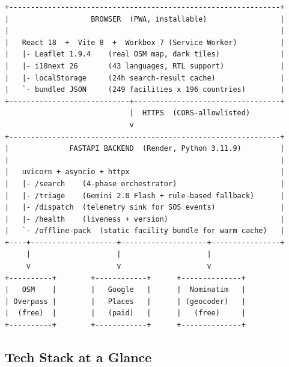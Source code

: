\documentclass[11pt, a4paper]{article}
\begin{document}
\begin{lstlisting}[language={},numbers=none,frame=none,backgroundcolor=\color{white}]
+---------------------------------------------------------------+
|                   BROWSER  (PWA, installable)                 |
|                                                               |
|   React 18  +  Vite 8  +  Workbox 7 (Service Worker)          |
|   |- Leaflet 1.9.4    (real OSM map, dark tiles)              |
|   |- i18next 26       (43 languages, RTL support)             |
|   |- localStorage     (24h search-result cache)               |
|   `- bundled JSON     (249 facilities x 196 countries)        |
+----------------------------+----------------------------------+
                             |  HTTPS  (CORS-allowlisted)
                             v
+---------------------------------------------------------------+
|              FASTAPI BACKEND  (Render, Python 3.11.9)         |
|                                                               |
|   uvicorn + asyncio + httpx                                   |
|   |- /search    (4-phase orchestrator)                        |
|   |- /triage    (Gemini 2.0 Flash + rule-based fallback)      |
|   |- /dispatch  (telemetry sink for SOS events)               |
|   |- /health    (liveness + version)                          |
|   `- /offline-pack  (static facility bundle for warm cache)   |
+----+--------------------+--------------------+----------------+
     |                    |                    |
     v                    v                    v
+----------+        +------------+      +--------------+
|   OSM    |        |   Google   |      |  Nominatim   |
| Overpass |        |   Places   |      | (geocoder)   |
|  (free)  |        |   (paid)   |      |   (free)     |
+----------+        +------------+      +--------------+
\end{lstlisting}

\subsection{Tech Stack at a Glance}
\end{document}
